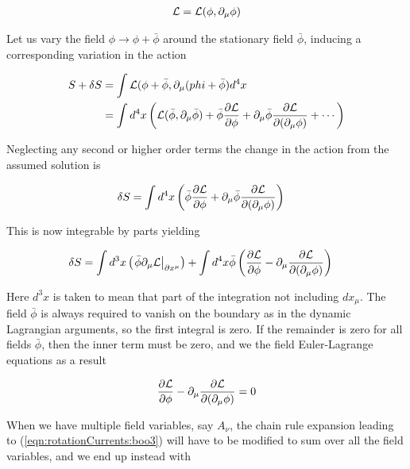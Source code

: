 \begin{align}\label{eqn:rotationCurrents:boo2}
\mathcal{L} = \mathcal{L}(\phi, \partial_\mu \phi)
\end{align}

Let us vary the field $\phi \rightarrow \phi + \bar{\phi}$ around the stationary field $\bar{\phi}$, inducing a corresponding variation in the action

\begin{align*}
S + \delta S
&= \int \mathcal{L}(\phi + \bar{\phi}, \partial_\mu (phi + \bar{\phi}) d^4 x \\
&= \int d^4 x \left(
\mathcal{L}(\bar{\phi}, \partial_\mu \bar{\phi})
+
\bar{\phi} \frac{\partial {\mathcal{L}}}{\partial {\phi}}
+\partial_\mu \bar{\phi} \frac{\partial {\mathcal{L}}}{\partial {(\partial_\mu \phi)}}
+ \cdots \right)
\end{align*}

Neglecting any second or higher order terms the change in the action from the assumed solution is

\begin{align}\label{eqn:rotationCurrents:boo3}
\delta S
&=
\int d^4 x \left( \bar{\phi} \frac{\partial {\mathcal{L}}}{\partial {\phi}} +\partial_\mu \bar{\phi} \frac{\partial {\mathcal{L}}}{\partial {(\partial_\mu \phi)}} \right)
\end{align}

This is now integrable by parts yielding

\begin{align}\label{eqn:rotationCurrents:boo4}
\delta S
&=
\int d^3 x \left( {\left. \bar{\phi} \partial_\mu \mathcal{L} \right\vert}_{\partial x^\mu} \right)
+
\int d^4 x \bar{\phi} \left( \frac{\partial {\mathcal{L}}}{\partial {\phi}} - \partial_\mu \frac{\partial {\mathcal{L}}}{\partial {(\partial_\mu \phi)}} \right)
\end{align}

Here $d^3 x$ is taken to mean that part of the integration not including $dx_\mu$.  The field $\bar{\phi}$ is always required to vanish on the boundary as in the dynamic Lagrangian arguments, so the first integral is zero.  If the remainder is zero for all fields $\bar{\phi}$, then the inner term must be zero, and we the field Euler-Lagrange equations as a result

\begin{align}\label{eqn:rotationCurrents:boo5}
\frac{\partial {\mathcal{L}}}{\partial {\phi}} - \partial_\mu \frac{\partial {\mathcal{L}}}{\partial {(\partial_\mu \phi)}} = 0
\end{align}

When we have multiple field variables, say $A_\nu$, the chain rule expansion leading to (\ref{eqn:rotationCurrents:boo3}) will have to be modified to sum over all the field variables, and we end up instead with

